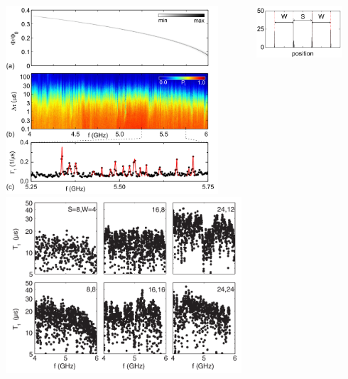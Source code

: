 \documentclass[aspectratio=169, 13pt, t]{beamer}
\begin{document}
\begin{frame}[c]\frametitle{\secname}\framesubtitle{\subsecname}
\begin{columns}[c]
\centering
\includegraphics[width=0.9\textwidth]{defectsT1}
\centering
\includegraphics[width=\textwidth]{defectsT12}

\includegraphics[width=0.8\textwidth]{defect_pos}
\end{columns}
\end{frame}
\end{document}
